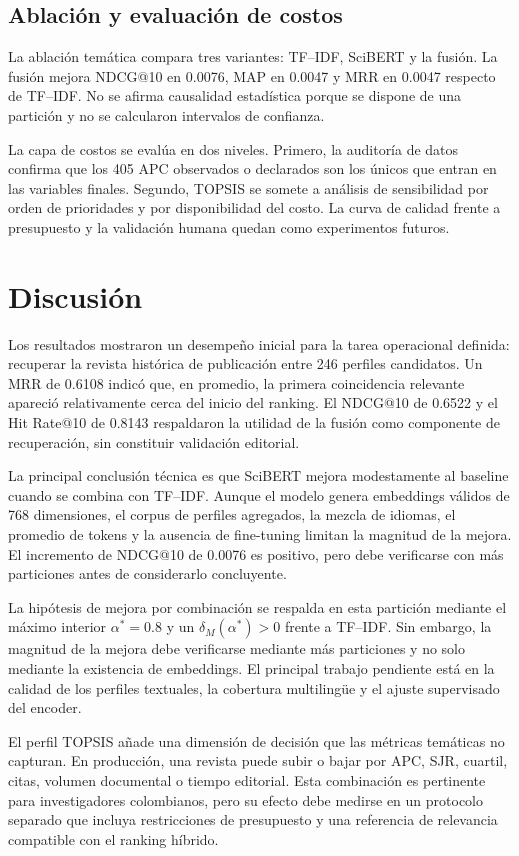 \documentclass[12pt,a4paper]{article}
\begin{document}
\subsection{Ablación y evaluación de costos}
La ablación temática compara tres variantes: TF--IDF, SciBERT y la fusión. La fusión mejora NDCG@10 en 0.0076, MAP en 0.0047 y MRR en 0.0047 respecto de TF--IDF. No se afirma causalidad estadística porque se dispone de una partición y no se calcularon intervalos de confianza.

La capa de costos se evalúa en dos niveles. Primero, la auditoría de datos confirma que los 405 APC observados o declarados son los únicos que entran en las variables finales. Segundo, TOPSIS se somete a análisis de sensibilidad por orden de prioridades y por disponibilidad del costo. La curva de calidad frente a presupuesto y la validación humana quedan como experimentos futuros.

\section{Discusión}
Los resultados mostraron un desempeño inicial para la tarea operacional definida: recuperar la revista histórica de publicación entre 246 perfiles candidatos. Un MRR de 0.6108 indicó que, en promedio, la primera coincidencia relevante apareció relativamente cerca del inicio del ranking. El NDCG@10 de 0.6522 y el Hit Rate@10 de 0.8143 respaldaron la utilidad de la fusión como componente de recuperación, sin constituir validación editorial.

La principal conclusión técnica es que SciBERT mejora modestamente al baseline cuando se combina con TF--IDF. Aunque el modelo genera embeddings válidos de 768 dimensiones, el corpus de perfiles agregados, la mezcla de idiomas, el promedio de tokens y la ausencia de fine-tuning limitan la magnitud de la mejora. El incremento de NDCG@10 de 0.0076 es positivo, pero debe verificarse con más particiones antes de considerarlo concluyente.

La hipótesis de mejora por combinación se respalda en esta partición mediante el máximo interior $\alpha^*=0.8$ y un $\delta_M(\alpha^*)>0$ frente a TF--IDF. Sin embargo, la magnitud de la mejora debe verificarse mediante más particiones y no solo mediante la existencia de embeddings. El principal trabajo pendiente está en la calidad de los perfiles textuales, la cobertura multilingüe y el ajuste supervisado del encoder.

El perfil TOPSIS añade una dimensión de decisión que las métricas temáticas no capturan. En producción, una revista puede subir o bajar por APC, SJR, cuartil, citas, volumen documental o tiempo editorial. Esta combinación es pertinente para investigadores colombianos, pero su efecto debe medirse en un protocolo separado que incluya restricciones de presupuesto y una referencia de relevancia compatible con el ranking híbrido.
\end{document}
